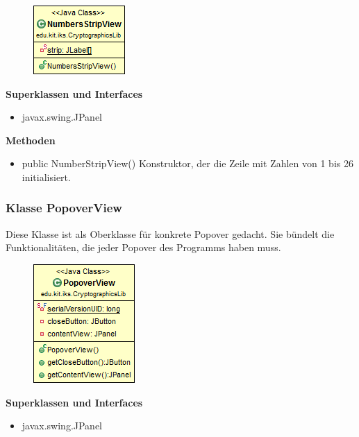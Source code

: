 \documentclass{article}
\begin{document}
      \begin{figure}[H]
        \centering
        \includegraphics{resources/edu-kit-iks-CryptographicsLib-NumbersStripView}
      \end{figure}
	
      \textbf{Superklassen und Interfaces}
      \begin{itemize}
        \item javax.swing.JPanel
      \end{itemize}
	
      \textbf{Methoden}
      \begin{itemize}
        \item public NumberStripView() \newline
          Konstruktor, der die Zeile mit Zahlen von 1 bis 26 initialisiert.
      \end{itemize}
	
	\subsubsection{Klasse PopoverView}
	  Diese Klasse ist als Oberklasse für konkrete Popover gedacht. Sie
	  bündelt die Funktionalitäten, die jeder Popover des Programms haben muss.
	
      \begin{figure}[H]
        \centering
        \includegraphics{resources/edu-kit-iks-CryptographicsLib-PopoverView}
      \end{figure}
	
      \textbf{Superklassen und Interfaces}
      \begin{itemize}
        \item javax.swing.JPanel
      \end{itemize}
	
\end{document}
